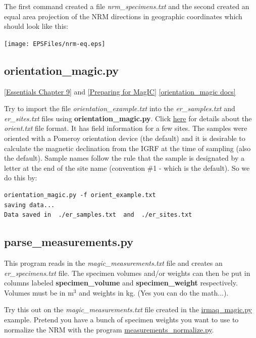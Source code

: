 \documentclass[11pt]{book}
\begin{document}
{{{{\begin{verbatim}
 \end{verbatim}

 The first command created a file {\it nrm\_specimens.txt} and the second created an equal area projection of the NRM directions in geographic coordinates which should look like this:

\texttt{[image: EPSFiles/nrm-eq.eps]}
%


 \subsection{orientation\_magic.py}
 \href{http://earthref.org/MAGIC/books/Tauxe/Essentials/WebBook3ch9.html#ch9}{[Essentials Chapter 9]} and \href{#field_info}{[Preparing for MagIC]}
 \href{https://github.com/PmagPy/PmagPy/blob/master/programs/orientation_magic.py}{[orientation\_magic docs]}


  Try to import the file {\it orientation\_example.txt} into the {\it er\_samples.txt} and {\it er\_sites.txt} files using {\bf orientation\_magic.py}.  Click \href{#field_info}{here}  for details about the {\it orient.txt} file format.  It has field information for a few sites.  The samples were oriented with a Pomeroy orientation device  (the default) and it is desirable to calculate the magnetic declination from the IGRF at the time of sampling (also the default).  Sample names follow the rule that the sample is designated by a letter at the end of the site name (convention \#1 - which is the default).  So we do this by:

  \begin{verbatim}
orientation_magic.py -f orient_example.txt
saving data...
Data saved in  ./er_samples.txt  and  ./er_sites.txt

\end{verbatim}

%

\subsection{parse\_measurements.py}

This program reads in the {\it magic\_measurements.txt} file and creates an {\it er\_specimens.txt} file.   The specimen volumes and/or weights can then be put in columns labeled {\bf specimen\_volume} and {\bf specimen\_weight} respectively.  Volumes must be in m$^3$ and weights in kg.  (Yes you can do the math...).

Try this out on the {\it magic\_measurements.txt} file created in the \href{#irmaq_magic.py}{irmaq\_magic.py} example.  Pretend you have a bunch of specimen weights you want to use to normalize the NRM with the program \href{#measurements_normalize.py}{measurements\_normalize.py}.

}}}}
\end{document}
